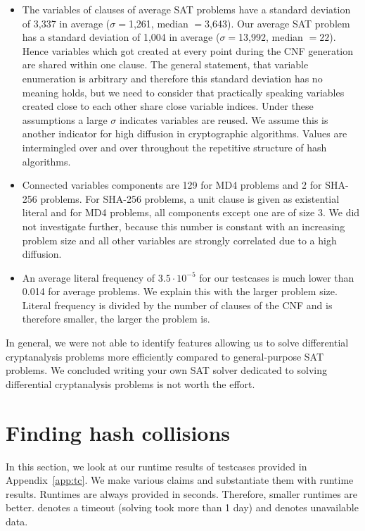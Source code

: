 \begin{itemize}
  \item The variables of clauses of average SAT problems
    have a standard deviation of 3,337 in average ($\sigma=$1,261, median $=$3,643).
    Our average SAT problem has a standard deviation of 1,004 in average
    ($\sigma=$13,992, median $=22$). Hence variables which got created at every
    point during the CNF generation are shared within one clause.
    The general statement, that variable enumeration is arbitrary
    and therefore this standard deviation has no meaning holds, but we need
    to consider that practically speaking variables created close to each
    other share close variable indices.
    Under these assumptions a large $\sigma$ indicates variables are reused.
    We assume this is another indicator for high diffusion in cryptographic
    algorithms. Values are intermingled over and over throughout the repetitive
    structure of hash algorithms.

  \item Connected variables components are 129 for MD4 problems and 2 for SHA-256
    problems. For SHA-256 problems, a unit clause is given as existential literal
    and for MD4 problems, all components except one are of size 3.
    We did not investigate further, because this number is constant
    with an increasing problem size and all other variables are strongly
    correlated due to a high diffusion.

  \item An average literal frequency of $3.5\cdot 10^{-5}$ for our testcases
    is much lower than 0.014 for average problems. We explain this with the
    larger problem size. Literal frequency is divided by the number of clauses
    of the CNF and is therefore smaller, the larger the problem is.
\end{itemize}

In general, we were not able to identify features allowing us to solve
differential cryptanalysis problems more efficiently compared to
general-purpose SAT problems. We concluded writing your own SAT solver
dedicated to solving differential cryptanalysis problems is not worth
the effort.

\section{Finding hash collisions}
\label{sec:results-attacks}
%
In this section, we look at our runtime results of testcases provided in
Appendix~\ref{app:tc}. We make various claims and substantiate them
with runtime results. Runtimes are always provided in seconds. Therefore,
smaller runtimes are better. \timeout{} denotes a timeout (solving took
more than 1 day) and \unknown{} denotes unavailable data.

